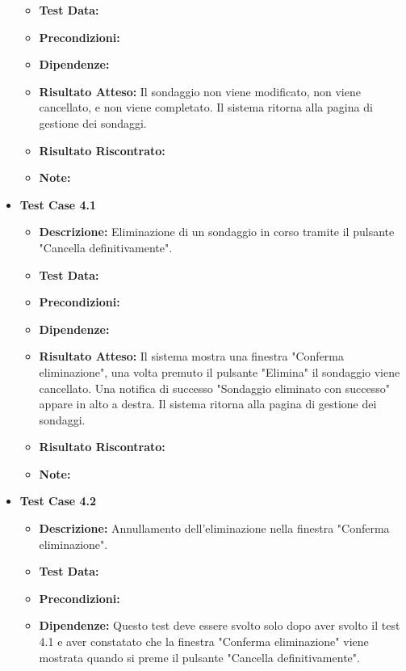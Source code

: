 \begin{itemize}
\begin{itemize}
                    \item \textbf{Test Data:}
                    \item \textbf{Precondizioni:}
                    \item \textbf{Dipendenze:}
                    \item \textbf{Risultato Atteso:} Il sondaggio non viene modificato, non viene cancellato, e non viene completato. Il sistema ritorna alla pagina di gestione dei sondaggi.
                    \item \textbf{Risultato Riscontrato:}
                    \item \textbf{Note:}
                \end{itemize}
            \item \textbf{Test Case 4.1} 
                \begin{itemize}
                    \item \textbf{Descrizione:} Eliminazione di un sondaggio in corso tramite il pulsante "Cancella definitivamente".
                    \item \textbf{Test Data:}
                    \item \textbf{Precondizioni:}
                    \item \textbf{Dipendenze:}
                    \item \textbf{Risultato Atteso:} Il sistema mostra una finestra "Conferma eliminazione", una volta premuto il pulsante "Elimina" il sondaggio viene cancellato. Una notifica di successo "Sondaggio eliminato con successo" appare in alto a destra. Il sistema ritorna alla pagina di gestione dei sondaggi.
                    \item \textbf{Risultato Riscontrato:}
                    \item \textbf{Note:}
                \end{itemize}
            \item \textbf{Test Case 4.2} 
                \begin{itemize}
                    \item \textbf{Descrizione:} Annullamento dell'eliminazione nella finestra "Conferma eliminazione".
                    \item \textbf{Test Data:}
                    \item \textbf{Precondizioni:}
                    \item \textbf{Dipendenze:} Questo test deve essere svolto solo dopo aver svolto il test 4.1 e aver constatato che la finestra "Conferma eliminazione" viene mostrata quando si preme il pulsante "Cancella definitivamente".

\end{itemize}
\end{itemize}
